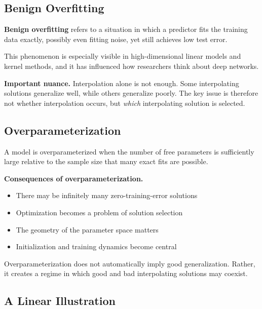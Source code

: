 \subsection{Benign Overfitting}

\textbf{Benign overfitting} refers to a situation in which a predictor fits the training data exactly, possibly even fitting noise, yet still achieves low test error.

\medskip

\noindent
This phenomenon is especially visible in high-dimensional linear models and kernel methods, and it has influenced how researchers think about deep networks.

\medskip

\noindent
\textbf{Important nuance.}
Interpolation alone is not enough. Some interpolating solutions generalize well, while others generalize poorly. The key issue is therefore not whether interpolation occurs, but \emph{which} interpolating solution is selected.

\subsection{Overparameterization}

A model is overparameterized when the number of free parameters is sufficiently large relative to the sample size that many exact fits are possible.

\medskip

\noindent
\textbf{Consequences of overparameterization.}
\begin{itemize}
    \item There may be infinitely many zero-training-error solutions
    \item Optimization becomes a problem of solution selection
    \item The geometry of the parameter space matters
    \item Initialization and training dynamics become central
\end{itemize}

\medskip

\noindent
Overparameterization does not automatically imply good generalization. Rather, it creates a regime in which good and bad interpolating solutions may coexist.

\subsection{A Linear Illustration}

